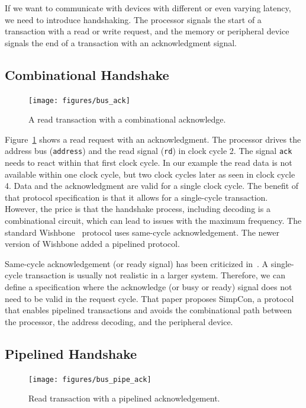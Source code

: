 \documentclass[%
    10pt,
    headinclude, footexclude,
    openright, %
    notitlepage,
    cleardoubleempty,
    headsepline,
    pointlessnumbers,
    bibtotoc, idxtotoc,
    ]{scrbook}
\newcommand{\code}[1]{{\small{\texttt{#1}}}}
\begin{document}
If we want to communicate with devices with different or even varying latency, we need to
introduce handshaking. The processor signals the start of a
transaction with a read or write request, and the memory or peripheral device signals the end of a transaction with
an acknowledgment signal.

\subsection{Combinational Handshake}

\begin{figure}
  \centering
  \texttt{[image: figures/bus\_ack]}
  \caption{A read transaction with a combinational acknowledge.}
  \label{fig:bus_ack}
\end{figure}

Figure~\ref{fig:bus_ack} shows a read request with an acknowledgment.
The processor drives the address bus (\code{address}) and the read
signal (\code{rd}) in clock cycle 2. The signal \code{ack} needs to react
within that first clock cycle. In our example the read data is not available within
one clock cycle, but two clock cycles later as seen in clock cycle 4.
Data and the acknowledgment are valid for a single clock cycle.
The benefit of that protocol specification is that it allows for a single-cycle transaction.
However, the price is that the handshake process, including decoding is a combinational
circuit, which can lead to issues with the maximum frequency.
The standard Wishbone~\cite{soc:wishbone} protocol uses same-cycle
acknowledgement. The newer version of Wishbone added a pipelined
protocol.

Same-cycle acknowledgement (or ready signal) has been criticized in~\cite{simpcon}.
A single-cycle transaction is usually not realistic in a larger system. Therefore,
we can define a specification where the acknowledge (or busy or ready) signal
does not need to be valid in the request cycle.
That paper proposes SimpCon, a protocol that enables pipelined transactions and
avoids the combinational path between the processor, the address decoding, and the
peripheral device.

\subsection{Pipelined Handshake}

\begin{figure}
  \centering
  \texttt{[image: figures/bus\_pipe\_ack]}
  \caption{Read transaction with a pipelined acknowledgement.}
  \label{fig:bus_pipe_ack}
\end{figure}
\end{document}
